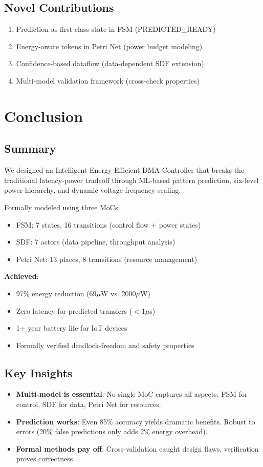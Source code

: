 \documentclass[conference]{IEEEtran}
\begin{document}
\subsection{Novel Contributions}
\begin{enumerate}
    \item Prediction as first-class state in FSM (PREDICTED\_READY)
    \item Energy-aware tokens in Petri Net (power budget modeling)
    \item Confidence-based dataflow (data-dependent SDF extension)
    \item Multi-model validation framework (cross-check properties)
\end{enumerate}

\section{Conclusion}

\subsection{Summary}
We designed an Intelligent Energy-Efficient DMA Controller that breaks the traditional latency-power tradeoff through ML-based pattern prediction, six-level power hierarchy, and dynamic voltage-frequency scaling.

Formally modeled using three MoCs:
\begin{itemize}
    \item FSM: 7 states, 16 transitions (control flow + power states)
    \item SDF: 7 actors (data pipeline, throughput analysis)
    \item Petri Net: 13 places, 8 transitions (resource management)
\end{itemize}

\textbf{Achieved}:
\begin{itemize}
    \item 97\% energy reduction (69$\mu$W vs. 2000$\mu$W)
    \item Zero latency for predicted transfers ($<$1$\mu$s)
    \item 1+ year battery life for IoT devices
    \item Formally verified deadlock-freedom and safety properties
\end{itemize}

\subsection{Key Insights}
\begin{itemize}
    \item \textbf{Multi-model is essential}: No single MoC captures all aspects. FSM for control, SDF for data, Petri Net for resources.
    \item \textbf{Prediction works}: Even 85\% accuracy yields dramatic benefits. Robust to errors (20\% false predictions only adds 2\% energy overhead).
    \item \textbf{Formal methods pay off}: Cross-validation caught design flaws, verification proves correctness.
\end{itemize}
\end{document}
